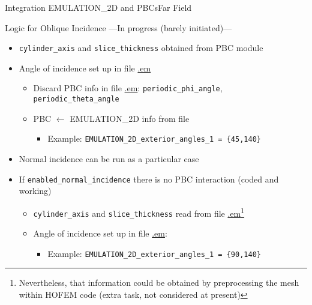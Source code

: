 \begin{frame}{Integration EMULATION\_2D and PBCs}{Far Field}

  \begin{block}{Logic for Oblique Incidence
      ---\alert{In progress
        (barely initiated)}---}
    \begin{itemize}
    \item \verb|cylinder_axis| and \verb|slice_thickness| obtained  from
      PBC module

    \item Angle of incidence set up in file \url{.em}
      \begin{itemize}
      \item Discard PBC info in file \url{.em}:
        \verb|periodic_phi_angle|, \verb|periodic_theta_angle|
      \item PBC $\longleftarrow$ EMULATION\_2D info from file
        \begin{itemize}
        \item Example: \verb|EMULATION_2D_exterior_angles_1 = {45,140}|
        \end{itemize}
      \end{itemize}

    \item Normal incidence can be run as a particular case
    \end{itemize}
  \end{block}
  

  \begin{itemize}
  \item If \verb|enabled_normal_incidence| there is no PBC interaction (\alert{coded and working})
    \begin{itemize}
    \item \verb|cylinder_axis| and \verb|slice_thickness| read from
      file \url{.em}\footnote{Nevertheless, that information could be
        obtained by preprocessing the mesh within HOFEM code (extra
        task, not considered at present)}
    \item Angle of incidence set up in file \url{.em}:
      \begin{itemize}
      \item Example: \verb|EMULATION_2D_exterior_angles_1 = {90,140}|
      \end{itemize}
    \end{itemize}
  \end{itemize}

  
\end{frame}

